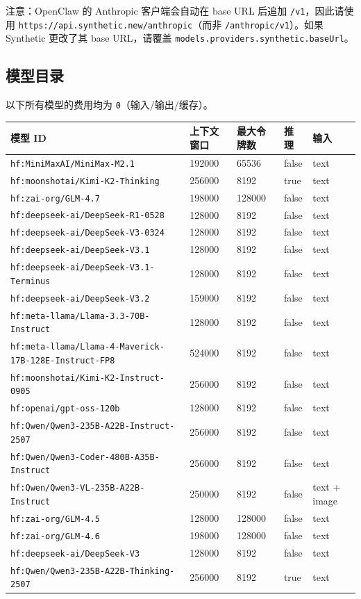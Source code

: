 注意：OpenClaw 的 Anthropic 客户端会自动在 base URL 后追加 \texttt{/v1}，因此请使用 \texttt{https://api.synthetic.new/anthropic}（而非 \texttt{/anthropic/v1}）。如果 Synthetic 更改了其 base URL，请覆盖 \texttt{models.providers.synthetic.baseUrl}。

\subsection{模型目录}


以下所有模型的费用均为 \texttt{0}（输入/输出/缓存）。


\begin{table}[h]
\centering
\small
\begin{tabular}{|l|l|l|l|l|}
\hline
模型 ID & 上下文窗口 & 最大令牌数 & 推理 & 输入 \\
\hline
\texttt{hf:MiniMaxAI/MiniMax-M2.1} & 192000 & 65536 & false & text \\
\hline
\texttt{hf:moonshotai/Kimi-K2-Thinking} & 256000 & 8192 & true & text \\
\hline
\texttt{hf:zai-org/GLM-4.7} & 198000 & 128000 & false & text \\
\hline
\texttt{hf:deepseek-ai/DeepSeek-R1-0528} & 128000 & 8192 & false & text \\
\hline
\texttt{hf:deepseek-ai/DeepSeek-V3-0324} & 128000 & 8192 & false & text \\
\hline
\texttt{hf:deepseek-ai/DeepSeek-V3.1} & 128000 & 8192 & false & text \\
\hline
\texttt{hf:deepseek-ai/DeepSeek-V3.1-Terminus} & 128000 & 8192 & false & text \\
\hline
\texttt{hf:deepseek-ai/DeepSeek-V3.2} & 159000 & 8192 & false & text \\
\hline
\texttt{hf:meta-llama/Llama-3.3-70B-Instruct} & 128000 & 8192 & false & text \\
\hline
\texttt{hf:meta-llama/Llama-4-Maverick-17B-128E-Instruct-FP8} & 524000 & 8192 & false & text \\
\hline
\texttt{hf:moonshotai/Kimi-K2-Instruct-0905} & 256000 & 8192 & false & text \\
\hline
\texttt{hf:openai/gpt-oss-120b} & 128000 & 8192 & false & text \\
\hline
\texttt{hf:Qwen/Qwen3-235B-A22B-Instruct-2507} & 256000 & 8192 & false & text \\
\hline
\texttt{hf:Qwen/Qwen3-Coder-480B-A35B-Instruct} & 256000 & 8192 & false & text \\
\hline
\texttt{hf:Qwen/Qwen3-VL-235B-A22B-Instruct} & 250000 & 8192 & false & text + image \\
\hline
\texttt{hf:zai-org/GLM-4.5} & 128000 & 128000 & false & text \\
\hline
\texttt{hf:zai-org/GLM-4.6} & 198000 & 128000 & false & text \\
\hline
\texttt{hf:deepseek-ai/DeepSeek-V3} & 128000 & 8192 & false & text \\
\hline
\texttt{hf:Qwen/Qwen3-235B-A22B-Thinking-2507} & 256000 & 8192 & true & text \\
\hline
\end{tabular}
\end{table}



